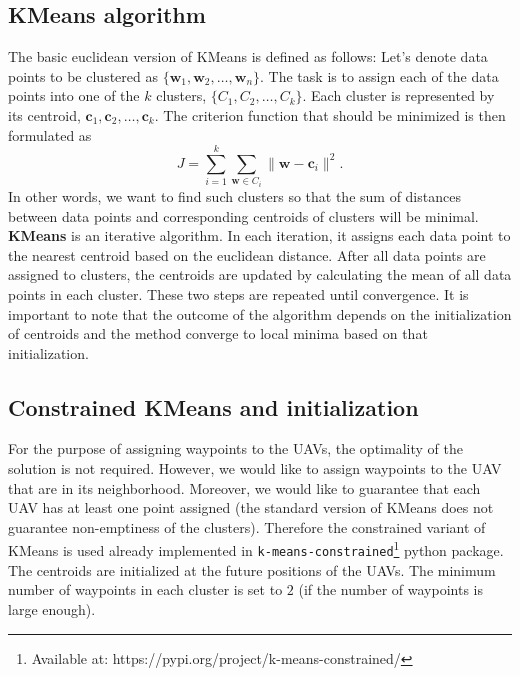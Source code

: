 \subsection{KMeans algorithm}
The basic euclidean version of KMeans is defined as follows:
Let's denote data points to be clustered as $\{\mathbf{w}_{1}, \mathbf{w}_{2}, \dots , \mathbf{w}_{n}\}$.
The task is to assign each of the data points into one of the $k$ clusters, $\{C_{1}, C_{2}, \dots, C_{k}\}$.
Each cluster is represented by its centroid, $\mathbf{c}_{1}, \mathbf{c}_{2}, \dots, \mathbf{c}_{k}$.
The criterion function that should be minimized is then formulated as
\begin{equation}
  J = \sum_{i = 1}^{k} \sum_{\mathbf{w} \in C_{i}} \| \mathbf{w} - \mathbf{c}_{i} \|^{2}.
\end{equation}
In other words, we want to find such clusters so that the sum of distances between data points and corresponding centroids of clusters will be minimal.
\textbf{KMeans} is an iterative algorithm.
In each iteration, it assigns each data point to the nearest centroid based on the euclidean distance. 
After all data points are assigned to clusters, the centroids are updated by calculating the mean of all data points in each cluster. 
These two steps are repeated until convergence.
It is important to note that the outcome of the algorithm depends on the initialization of centroids and the method converge to local minima based on that initialization.

\subsection{Constrained KMeans and initialization}
For the purpose of assigning waypoints to the \ac{UAV}s, the optimality of the solution is not required.
However, we would like to assign waypoints to the \ac{UAV} that are in its neighborhood.
Moreover, we would like to guarantee that each \ac{UAV} has at least one point assigned (the standard version of KMeans does not guarantee non-emptiness of the clusters).
Therefore the constrained variant of KMeans \cite{constrained_kmeans} is used already implemented in \verb|k-means-constrained|\footnote{Available at: https://pypi.org/project/k-means-constrained/} python package.
The centroids are initialized at the future positions of the \ac{UAV}s.
The minimum number of waypoints in each cluster is set to $2$ (if the number of waypoints is large enough).%

